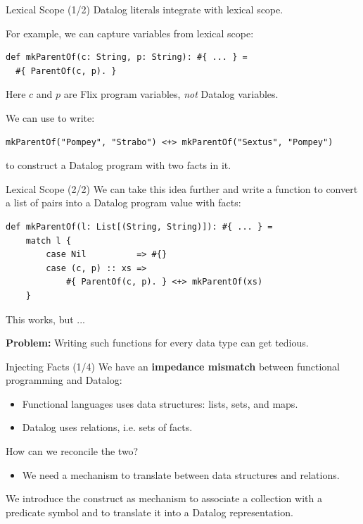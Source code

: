 \begin{frame}[fragile]{Lexical Scope (1/2)}
Datalog literals integrate with lexical scope.

For example, we can capture variables from lexical scope:

\begin{lstlisting}[language=flix, xleftmargin=0.8cm]
def mkParentOf(c: String, p: String): #{ ... } = 
  #{ ParentOf(c, p). }
\end{lstlisting}

Here $c$ and $p$ are Flix program variables, \emph{not} Datalog variables. 

\pause

We can use  to write:

\begin{lstlisting}[language=flix, xleftmargin=0.8cm]
mkParentOf("Pompey", "Strabo") <+> mkParentOf("Sextus", "Pompey")
\end{lstlisting}

to construct a Datalog program with two  facts in it.
\end{frame}

\begin{frame}[fragile]{Lexical Scope (2/2)}
We can take this idea further and write a function to convert a list of pairs
into a Datalog program value with  facts: 

\begin{lstlisting}[language=flix, xleftmargin=0.8cm]
def mkParentOf(l: List[(String, String)]): #{ ... } = 
    match l {
        case Nil          => #{}
        case (c, p) :: xs => 
            #{ ParentOf(c, p). } <+> mkParentOf(xs)
    }
\end{lstlisting}

\pause

This works, but ...

\textbf{Problem:} Writing such functions for every data type can get tedious.
\end{frame}

\begin{frame}[fragile]{Injecting Facts (1/4)}
We have an \textbf{impedance mismatch} between functional programming and Datalog:

\begin{itemize}
    \item Functional languages uses data structures: lists, sets, and maps.
    \item Datalog uses relations, i.e. sets of facts.
\end{itemize}

\pause

How can we reconcile the two? 

\begin{itemize}
    \item We need a mechanism to translate between data structures and
    relations. 
\end{itemize}

We introduce the  construct as mechanism to associate a collection
with a predicate symbol and to translate it into a Datalog representation.
\end{frame}

